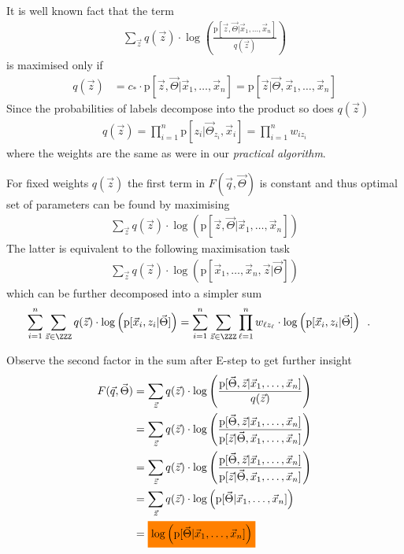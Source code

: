 \documentclass[landscape,footrule]{foils}
\newcommand{\pd}[1]{\mathrm{p}[#1]}
\begin{document}
It is well known fact that the term 
\begin{align*}
 \sum_{\vec{z}}q(\vec{z})\cdot\log\left(\frac{\pd{\vec{z},\vec{\Theta}|\vec{x}_1,\ldots,\vec{x}_n}}{q(\vec{z})}\right)
\end{align*}
is maximised only if 
\begin{align*}
q(\vec{z})&= c_*\cdot \pd{\vec{z},\vec{\Theta}|\vec{x}_1,\ldots,\vec{x}_n}=\pd{\vec{z}|\vec{\Theta},\vec{x}_1,\ldots,\vec{x}_n}
\end{align*}
Since the probabilities of labels decompose into the product so does $q(\vec{z})$
\begin{align*}
q(\vec{z})=\prod_{i=1}^n \pd{z_i|\vec{\Theta}_{z_i},\vec{x}_i}=\prod_{i=1}^n w_{iz_i}
\end{align*}
where the weights are the same as were in our \emph{practical algorithm}. 


For fixed weights $q(\vec{z})$ the first term in $F(\vec{q},\vec{\Theta})$ is constant and thus optimal set of parameters can be found by maximising
\begin{align*}
 \sum_{\vec{z}}q(\vec{z})\cdot\log\left(\pd{\vec{z},\vec{\Theta}|\vec{x}_1,\ldots,\vec{x}_n}\right)
\end{align*}
The latter is equivalent to the following maximisation task
\begin{align*}
 \sum_{\vec{z}}q(\vec{z})\cdot\log\left(\pd{\vec{x}_1,\ldots,\vec{x}_n, \vec{z}|\vec{\Theta}}\right)
\end{align*}
which can be further decomposed into a simpler sum
\begin{align*}
\sum_{i=1}^n \sum_{\vec{z}\in\ZZZ} q(\vec{z})\cdot\log\left(\pd{\vec{x}_i,z_i|\vec{\Theta}}\right)
&=\sum_{i=1}^n \sum_{\vec{z}\in\ZZZ}\prod_{\ell=1}^n w_{\ell z_\ell}\cdot\log\left(\pd{\vec{x}_i,z_i|\vec{\Theta}}\right)
\enspace.
\end{align*}



Observe the second factor in the sum after E-step to get further insight  
\begin{align*}
F(\vec{q},\vec{\Theta})&= \sum_{\vec{z}}q(\vec{z})\cdot\log\left(\frac{\pd{\vec{\Theta},\vec{z}|\vec{x}_1,\ldots,\vec{x}_n}}{q(\vec{z})}\right)\\
&=\sum_{\vec{z}}q(\vec{z})\cdot\log\left(\frac{\pd{\vec{\Theta},\vec{z}|\vec{x}_1,\ldots,\vec{x}_n}}{\pd{\vec{z}|\vec{\Theta},\vec{x}_1,\ldots,\vec{x}_n}}\right)\\
&= \sum_{\vec{z}}q(\vec{z})\cdot\log\left(\frac{\pd{\vec{\Theta},\vec{z}|\vec{x}_1,\ldots,\vec{x}_n}}{\pd{\vec{z}|\vec{\Theta},\vec{x}_1,\ldots,\vec{x}_n}}\right)\\
&= \sum_{\vec{z}}q(\vec{z})\cdot\log\left(\pd{\vec{\Theta}|\vec{x}_1,\ldots,\vec{x}_n}\right)\\
&= \colorbox{orange}{$\log\left(\pd{\vec{\Theta}|\vec{x}_1,\ldots,\vec{x}_n}\right)$}
\end{align*}
\end{document}
